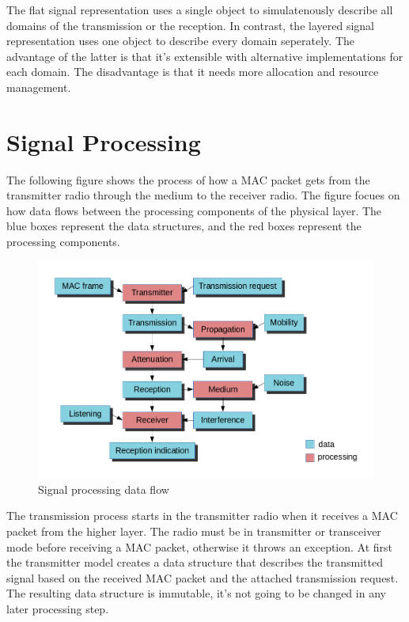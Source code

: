 The flat signal representation uses a single object to simulatenously describe
all domains of the transmission or the reception. In contrast, the layered
signal representation uses one object to describe every domain seperately. The
advantage of the latter is that it's extensible with alternative implementations
for each domain. The disadvantage is that it needs more allocation and resource
management.

\section{Signal Processing}

The following figure shows the process of how a MAC packet gets from the
transmitter radio through the medium to the receiver radio. The figure focues on
how data flows between the processing components of the physical layer. The blue
boxes represent the data structures, and the red boxes represent the processing
components.

\begin{figure}[h!]
\centering
\includegraphics[width=\textwidth]{figures/phydataflow}
\caption{Signal processing data flow}
\end{figure}

The transmission process starts in the transmitter radio when it receives a MAC
packet from the higher layer. The radio must be in transmitter or transceiver
mode before receiving a MAC packet, otherwise it throws an exception. At first
the transmitter model creates a data structure that describes the transmitted
signal based on the received MAC packet and the attached transmission request.
The resulting data structure is immutable, it's not going to be changed in any
later processing step.

